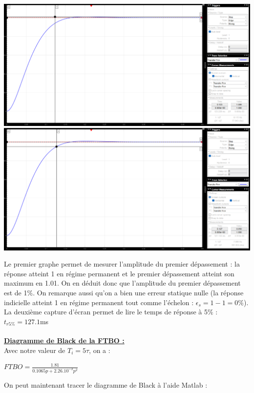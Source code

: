 \documentclass[12pt]{article}
\begin{document}
\begin{center}
    \includegraphics[width = 19 cm]{TP2 Simulink/Syst_1/depassement_syst_1_Ti=5tau.png}
    \includegraphics[width = 19 cm]{TP2 Simulink/Syst_1/tr5prct_syst_1_Ti=5tau.png}
    
\end{center}
\normalsize Le premier graphe permet de mesurer l'amplitude du premier dépassement : la réponse atteint 1 en régime permanent et le premier dépassement atteint son maximum en 1.01. On en déduit donc que l'amplitude du premier dépassement est de 1$\%$.
On remarque aussi qu'on a bien une erreur statique nulle (la réponse indicielle atteint 1 en régime permanent tout comme l'échelon : $\epsilon_s = 1-1 = 0\%$).
La deuxième capture d'écran permet de lire le temps de réponse à 5$\%$ : $t_{r5\%} = 127.1$ms
\\\\\underline{\bf Diagramme de Black de la FTBO :}
\\\normalsize Avec notre valeur de $T_i = 5\tau$, on a :
\begin{center}
    \large$FTBO = \frac{1.81}{0.1065p + 2.26.10^{-2}p^2}$
\end{center}
\normalsize On peut maintenant tracer le diagramme de Black à l'aide Matlab :
\end{document}
